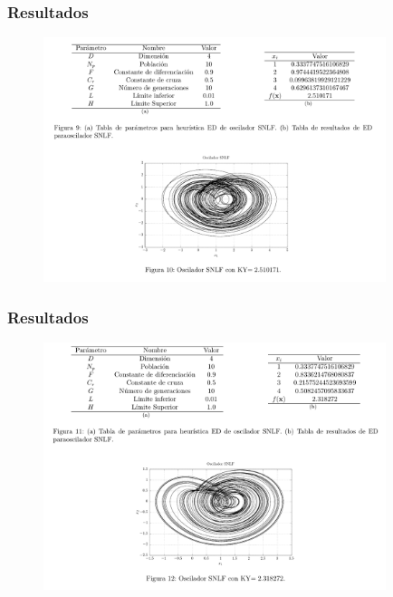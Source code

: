 \documentclass[10pt]{beamer}
\begin{document}
		\begin{frame}
		\frametitle{Resultados}

		
		\begin{figure}[hbtp]
			\centering
			\includegraphics[width = 10cm]{ex2.png}
		\end{figure}
		
	\end{frame}
	
		\begin{frame}
		\frametitle{Resultados}

		
		\begin{figure}[hbtp]
			\centering
			\includegraphics[width = 10cm]{ex3.png}
		\end{figure}
	\end{frame}
	
\end{document}

